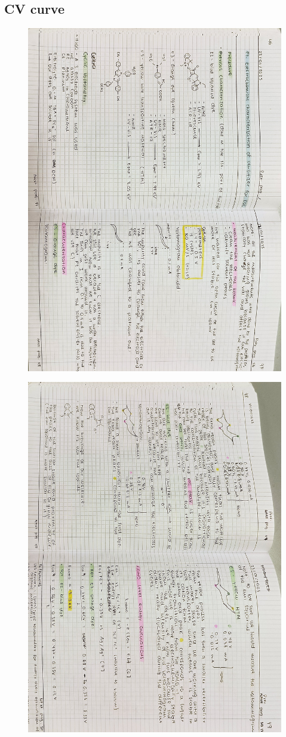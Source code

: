 \subsection{CV curve}
\begin{figure}[H]
	\centering
	\includegraphics[width=0.6\linewidth, angle=90]{../images/compressed/IMG20250123173124.jpg}
\end{figure}
\begin{figure}[H]
	\centering
	\includegraphics[width=0.6\linewidth, angle=90]{../images/compressed/IMG20250123173131.jpg}
\end{figure}
